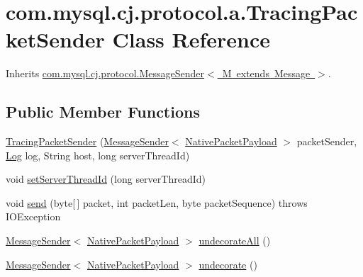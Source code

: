 \hypertarget{classcom_1_1mysql_1_1cj_1_1protocol_1_1a_1_1_tracing_packet_sender}{}\section{com.\+mysql.\+cj.\+protocol.\+a.\+Tracing\+Packet\+Sender Class Reference}
\label{classcom_1_1mysql_1_1cj_1_1protocol_1_1a_1_1_tracing_packet_sender}


Inherits \mbox{\hyperlink{interfacecom_1_1mysql_1_1cj_1_1protocol_1_1_message_sender}{com.\+mysql.\+cj.\+protocol.\+Message\+Sender$<$ M extends Message $>$}}.

\subsection*{Public Member Functions}
\begin{DoxyCompactItemize}
\item 
\mbox{\hyperlink{classcom_1_1mysql_1_1cj_1_1protocol_1_1a_1_1_tracing_packet_sender_a01a618aba9572be7d375093b4984a827}{Tracing\+Packet\+Sender}} (\mbox{\hyperlink{interfacecom_1_1mysql_1_1cj_1_1protocol_1_1_message_sender}{Message\+Sender}}$<$ \mbox{\hyperlink{classcom_1_1mysql_1_1cj_1_1protocol_1_1a_1_1_native_packet_payload}{Native\+Packet\+Payload}} $>$ packet\+Sender, \mbox{\hyperlink{interfacecom_1_1mysql_1_1cj_1_1log_1_1_log}{Log}} log, String host, long server\+Thread\+Id)
\item 
void \mbox{\hyperlink{classcom_1_1mysql_1_1cj_1_1protocol_1_1a_1_1_tracing_packet_sender_a97d2d479b56668ca11369ad3702483bf}{set\+Server\+Thread\+Id}} (long server\+Thread\+Id)
\item 
void \mbox{\hyperlink{classcom_1_1mysql_1_1cj_1_1protocol_1_1a_1_1_tracing_packet_sender_addcfce3e7ea16adf7933a367fb8f5904}{send}} (byte\mbox{[}$\,$\mbox{]} packet, int packet\+Len, byte packet\+Sequence)  throws I\+O\+Exception 
\item 
\mbox{\hyperlink{interfacecom_1_1mysql_1_1cj_1_1protocol_1_1_message_sender}{Message\+Sender}}$<$ \mbox{\hyperlink{classcom_1_1mysql_1_1cj_1_1protocol_1_1a_1_1_native_packet_payload}{Native\+Packet\+Payload}} $>$ \mbox{\hyperlink{classcom_1_1mysql_1_1cj_1_1protocol_1_1a_1_1_tracing_packet_sender_a57670e7bdafb2dd88cb711fb7e60266d}{undecorate\+All}} ()
\item 
\mbox{\hyperlink{interfacecom_1_1mysql_1_1cj_1_1protocol_1_1_message_sender}{Message\+Sender}}$<$ \mbox{\hyperlink{classcom_1_1mysql_1_1cj_1_1protocol_1_1a_1_1_native_packet_payload}{Native\+Packet\+Payload}} $>$ \mbox{\hyperlink{classcom_1_1mysql_1_1cj_1_1protocol_1_1a_1_1_tracing_packet_sender_aed3dc47d6e7a4dad4761e05b2f9213de}{undecorate}} ()
\end{DoxyCompactItemize}


